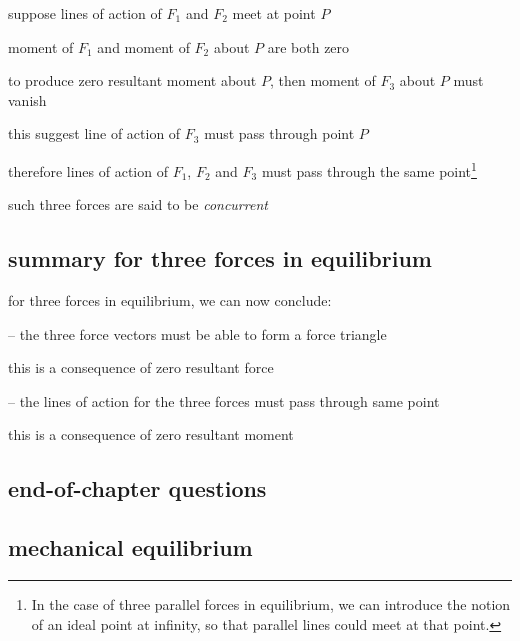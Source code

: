 suppose lines of action of $F_1$ and $F_2$ meet at point $P$

moment of $F_1$ and moment of $F_2$ about $P$ are both zero

to produce zero resultant moment about $P$, then moment of $F_3$ about $P$ must vanish

this suggest line of action of $F_3$ must pass through point $P$

therefore lines of action of $F_1$, $F_2$ and $F_3$ must pass through the same point\footnote{In the case of three parallel forces in equilibrium, we can introduce the notion of an ideal point at infinity, so that parallel lines could meet at that point.}

such three forces are said to be \emph{concurrent}

\subsection*{summary for three forces in equilibrium}

for three forces in equilibrium, we can now conclude:

\begin{compactenum}
	\item[--] the three force vectors must be able to form a force triangle
	
	this is a consequence of zero resultant force
	
	\item[--] the lines of action for the three forces must pass through same point
	
	this is a consequence of zero resultant moment
\end{compactenum}






\subsection{end-of-chapter questions}


\subsection*{mechanical equilibrium}



